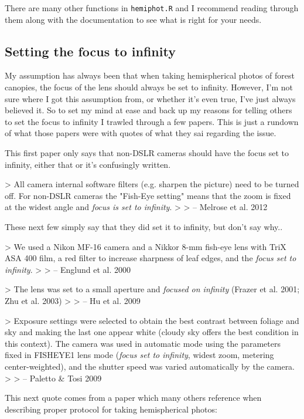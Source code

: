 \documentclass{article}
\begin{document}
There are many other functions in \texttt{hemiphot.R} and I recommend reading through them along with the documentation to see what is right for your needs.

\subsection{Setting the focus to infinity}

My assumption has always been that when taking hemispherical photos of forest canopies, the focus of the lens should always be set to infinity. However, I'm not sure where I got this assumption from, or whether it's even true, I've just always believed it. So to set my mind at ease and back up my reasons for telling others to set the focus to infinity I trawled through a few papers. This is just a rundown of what those papers were with quotes of what they sai regarding the issue.

This first paper only says that non-DSLR cameras should have the focus set to infinity, either that or it's confusingly written.

> All camera internal software filters (e.g. sharpen the picture) need to be turned off. For non-DSLR cameras the "Fish-Eye setting" means that the zoom is fixed at the widest angle and \textit{focus is set to infinity}.
> 
> -- Melrose et al. 2012

These next few simply say that they did set it to infinity, but don't say why..

> We used a Nikon MF-16 camera and a Nikkor 8-mm fish-eye lens with TriX ASA 400 film, a red filter to increase sharpness of leaf edges, and the \textit{focus set to infinity}.
>
> -- Englund et al. 2000

> The lens was set to a small aperture and \textit{focused on infinity} (Frazer et al. 2001; Zhu et al. 2003)
>
> -- Hu et al. 2009

> Exposure settings were selected to obtain the best contrast between foliage and sky and making the last one appear white (cloudy sky offers the best condition in this context). The camera was used in automatic mode using the parameters fixed in FISHEYE1 lens mode (\textit{focus set to infinity}, widest zoom, metering center-weighted), and the shutter speed was varied automatically by the camera.
> 
> -- Paletto \& Tosi 2009

This next quote comes from a paper which many others reference when describing proper protocol for taking hemispherical photos: 
\end{document}
